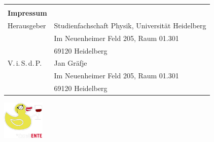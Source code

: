 \documentclass[a5paper]{scrbook}
\begin{document}
\begin{tabular*}{\textwidth}{ll}
{{\begin{tabbing}
		\end{tabbing}
       	}
      }\\  

        \textbf{Impressum} &\\
        Herausgeber & Studienfachschaft Physik, Universität Heidelberg \\
        & Im Neuenheimer Feld 205, Raum 01.301\\
        & 69120 Heidelberg\\
        V.\,i.\,S.\,d.\,P. & Jan Gräfje\\
        & Im Neuenheimer Feld 205, Raum 01.301\\
        & 69120 Heidelberg\\
    \end{tabular*}

    \vfill




\null
\newpage

\pagestyle{empty}
\null
{}

\newpage

\pagestyle{empty}
\null
{}

\vspace{2cm}
\raggedright
\hspace{-1.25cm}
\includegraphics[angle=270, width=2cm]{media/exzellente}


\newpage
\end{document}
